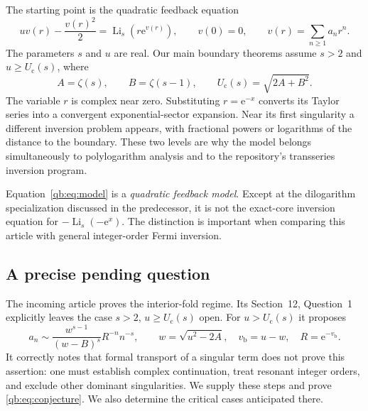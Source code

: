 \documentclass[11pt,a4paper]{article}
\theoremstyle{definition}\newtheorem{definition}[theorem]{Definition}
\theoremstyle{remark}\newtheorem{remark}[theorem]{Remark}
\newcommand{\Li}{\operatorname{Li}}
\newcommand{\ee}{\mathrm e}
\newcommand{\Uc}{U_{\mathrm c}}
\newcommand{\vb}{v_{\mathrm b}}
\numberwithin{equation}{section}
\begin{document}
The starting point is the quadratic feedback equation
\begin{equation}\label{qb:eq:model}
 uv(r)-\frac{v(r)^2}{2}=\Li_s\!\left(r\ee^{v(r)}\right),
 \qquad v(0)=0,\qquad v(r)=\sum_{n\ge1}a_n r^n.
\end{equation}
The parameters $s$ and $u$ are real. Our main boundary theorems assume
$s>2$ and $u\ge\Uc(s)$, where
\begin{equation}\label{qb:eq:critical}
 A=\zeta(s),\qquad B=\zeta(s-1),\qquad
 \Uc(s)=\sqrt{2A+B^2}.
\end{equation}
The variable $r$ is complex near zero. Substituting $r=\ee^{-x}$ converts
its Taylor series into a convergent exponential-sector expansion. Near its
first singularity a different inversion problem appears, with fractional
powers or logarithms of the distance to the boundary. These two levels are
why the model belongs simultaneously to polylogarithm analysis and to the
repository's transseries inversion program.

Equation~\eqref{qb:eq:model} is a \emph{quadratic feedback model}. Except at
the dilogarithm specialization discussed in the predecessor, it is not the
exact-core inversion equation for $-\Li_s(-\ee^x)$. The distinction is
important when comparing this article with general integer-order Fermi
inversion.

\subsection{A precise pending question}

The incoming article \cite{prior} proves the interior-fold regime. Its
Section~12, Question~1 explicitly leaves the case $s>2$, $u\ge\Uc(s)$ open.
For $u>\Uc(s)$ it proposes
\begin{equation}\label{qb:eq:conjecture}
 a_n\sim \frac{w^{s-1}}{(w-B)^s}R^{-n}n^{-s},\qquad
 w=\sqrt{u^2-2A},\quad \vb=u-w,\quad R=\ee^{-\vb}.
\end{equation}
It correctly notes that formal transport of a singular term does not prove
this assertion: one must establish complex continuation, treat resonant
integer orders, and exclude other dominant singularities. We supply these
steps and prove \eqref{qb:eq:conjecture}. We also determine the critical
cases anticipated there.
\end{document}

